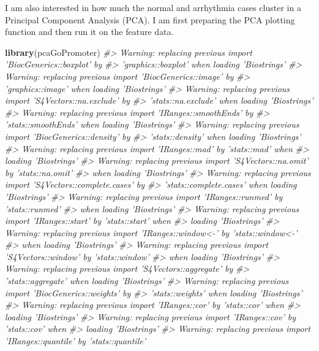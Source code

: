 \documentclass[]{book}
\newenvironment{Shaded}{\begin{snugshade}}{\end{snugshade}}
\newcommand{\CommentTok}[1]{\textcolor[rgb]{0.56,0.35,0.01}{\textit{#1}}}
\newcommand{\KeywordTok}[1]{\textcolor[rgb]{0.13,0.29,0.53}{\textbf{#1}}}
\newcommand{\NormalTok}[1]{#1}
\begin{document}
I am also interested in how much the normal and arrhythmia cases cluster in a Principal Component Analysis (PCA). I am first preparing the PCA plotting function and then run it on the feature data.

\begin{Shaded}
\begin{Highlighting}[]
\KeywordTok{library}\NormalTok{(pcaGoPromoter)}
\CommentTok{#> Warning: replacing previous import 'BiocGenerics::boxplot' by}
\CommentTok{#> 'graphics::boxplot' when loading 'Biostrings'}
\CommentTok{#> Warning: replacing previous import 'BiocGenerics::image' by}
\CommentTok{#> 'graphics::image' when loading 'Biostrings'}
\CommentTok{#> Warning: replacing previous import 'S4Vectors::na.exclude' by}
\CommentTok{#> 'stats::na.exclude' when loading 'Biostrings'}
\CommentTok{#> Warning: replacing previous import 'IRanges::smoothEnds' by}
\CommentTok{#> 'stats::smoothEnds' when loading 'Biostrings'}
\CommentTok{#> Warning: replacing previous import 'BiocGenerics::density' by}
\CommentTok{#> 'stats::density' when loading 'Biostrings'}
\CommentTok{#> Warning: replacing previous import 'IRanges::mad' by 'stats::mad' when}
\CommentTok{#> loading 'Biostrings'}
\CommentTok{#> Warning: replacing previous import 'S4Vectors::na.omit' by 'stats::na.omit'}
\CommentTok{#> when loading 'Biostrings'}
\CommentTok{#> Warning: replacing previous import 'S4Vectors::complete.cases' by}
\CommentTok{#> 'stats::complete.cases' when loading 'Biostrings'}
\CommentTok{#> Warning: replacing previous import 'IRanges::runmed' by 'stats::runmed'}
\CommentTok{#> when loading 'Biostrings'}
\CommentTok{#> Warning: replacing previous import 'IRanges::start' by 'stats::start' when}
\CommentTok{#> loading 'Biostrings'}
\CommentTok{#> Warning: replacing previous import 'IRanges::window<-' by 'stats::window<-'}
\CommentTok{#> when loading 'Biostrings'}
\CommentTok{#> Warning: replacing previous import 'S4Vectors::window' by 'stats::window'}
\CommentTok{#> when loading 'Biostrings'}
\CommentTok{#> Warning: replacing previous import 'S4Vectors::aggregate' by}
\CommentTok{#> 'stats::aggregate' when loading 'Biostrings'}
\CommentTok{#> Warning: replacing previous import 'BiocGenerics::weights' by}
\CommentTok{#> 'stats::weights' when loading 'Biostrings'}
\CommentTok{#> Warning: replacing previous import 'IRanges::cor' by 'stats::cor' when}
\CommentTok{#> loading 'Biostrings'}
\CommentTok{#> Warning: replacing previous import 'IRanges::cov' by 'stats::cov' when}
\CommentTok{#> loading 'Biostrings'}
\CommentTok{#> Warning: replacing previous import 'IRanges::quantile' by 'stats::quantile'}

\end{Highlighting}
\end{Shaded}
\end{document}
